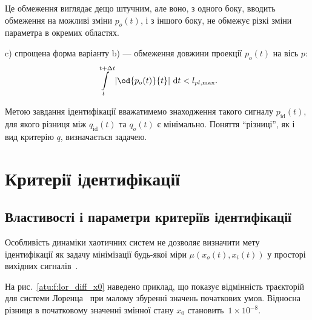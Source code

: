 Це обмеження виглядає дещо штучним, але воно, з одного боку,
вводить обмеження на можливі зміни
$ p_o (t) $, і з іншого боку, не обмежує різкі зміни параметра в
окремих областях.

c) спрощена форма варіанту b) --- обмеження довжини проекції
$ p_o (t) $ на вісь
$ p $:
%
\begin{equation}
  \int\limits_{t}^{t+\Delta t} \left| \od{p_o(t)}{t} \right | \, \mathrm{d}t < l_{pl,\max}.
  \label{atu:eq:p_lim_pl}
\end{equation}

Метою завдання ідентифікації вважатимемо знаходження такого
сигналу
$ p_\mathrm{id}(t) $, для якого різниця
між $ q_\mathrm{id}(t) $ та
$ q_o (t) $ є мінімально. Поняття ``різниці'', як і вид критерію
$q$, визначається задачею.


\section{Критерії ідентифікації} %

\subsection{Властивості і параметри критеріїв ідентифікації} %

Особливість динаміки хаотичних систем не дозволяє визначити мету ідентифікації
як задачу мінімізації будь-якої міри
$\mu(x_o(t), x_i(t))$ у просторі вихідних
сигналів~\cite{atu_asau11,atu_asau12,atu_asau14,atu_electronika2013}.


На рис.~\ref{atu:f:lor_diff_x0} наведено приклад, що показує відмінність
траєкторій для системи Лоренца~\cite{moon_chaotic_vibr} при малому збуренні
значень початкових умов. Відносна різниця в початковому
значенні змінної стану
$x_0$ становить~$1 \times 10^{-8}$.

